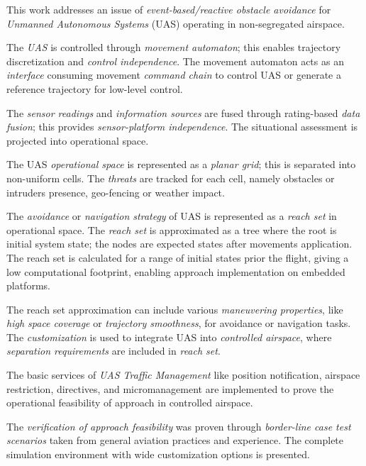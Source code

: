 \noindent This work addresses an issue of \emph{event-based/reactive obstacle avoidance} for \emph{Unmanned Autonomous Systems} (UAS) operating in non-segregated airspace. 

The \emph{UAS} is controlled through \emph{movement automaton}; this enables trajectory discretization and \emph{control independence}. The movement automaton acts as an \emph{interface} consuming movement \emph{command chain} to control UAS or generate a reference trajectory for low-level control.

The \emph{sensor readings} and \emph{information sources} are fused through rating-based \emph{data fusion}; this provides \emph{sensor-platform independence}. The situational assessment is projected into operational space.

The UAS \emph{operational space} is represented as a \emph{planar grid}; this is separated into non-uniform cells. The \emph{threats} are tracked for each cell, namely obstacles or intruders presence, geo-fencing or weather impact. 

The \emph{avoidance} or \emph{navigation strategy} of UAS is represented as a \emph{reach set} in operational space. The \emph{reach set} is approximated as a tree where the root is initial system state; the nodes are expected states after movements application. The reach set is calculated for a range of initial states prior the flight, giving a low computational footprint, enabling approach implementation on embedded platforms. 

The reach set approximation can include various \emph{maneuvering properties}, like \emph{high space coverage} or \emph{trajectory smoothness}, for avoidance or navigation tasks. The \emph{customization} is used to integrate UAS into \emph{controlled airspace}, where \emph{separation requirements} are included in \emph{reach set}.

The basic services of \emph{UAS Traffic Management} like position notification, airspace restriction, directives, and micromanagement are implemented to prove the operational feasibility of approach in controlled airspace. 

The \emph{verification of approach feasibility} was proven through \emph{border-line case test scenarios} taken from general aviation practices and experience. The complete simulation environment with wide customization options is presented.